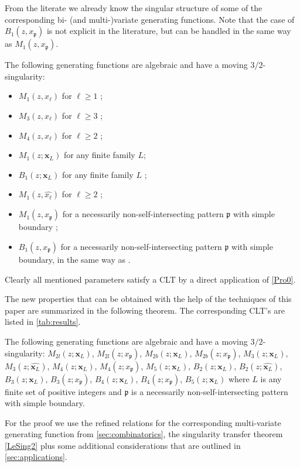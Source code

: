 \documentclass[a4paper,UKenglish,cleveref, autoref, thm-restate]{lipics-v2021}
\renewcommand{\(}{\left(}
\renewcommand{\)}{\right)}
\newcommand{\nnsi}{necessarily non-self-intersecting}
\newcommand{\p}{\mathfrak{p}}
\newcommand{\subfamily}{_L}
\newcommand{\xface}{x_{\ell}}
\newcommand{\x}{\mathbf{x}\subfamily}
\newcommand{\xellgon}{\widehat{\xface}}
\newcommand{\xallgons}{\widehat{\x}}
\newcommand{\xpatt}{x_{\p}}
\begin{document}
From the literate we already know the singular structure 
of some of the corresponding bi- (and multi-)variate generating functions.
Note that the case of $B_1(z,x_{\p})$ is not explicit in the literature,
but can be handled in the same way as $M_1(z,x_{\p})$.
\begin{proposition}
\label{prop:state-art-3-2-sg}
The following generating functions are algebraic and have a moving $3/2$-singularity:
\begin{itemize}
    \item $M_1(z, \xface)$ for $\ell \geq 1$ \cite[Lemma 4]{DP13};
    \item $M_3(z, \xface)$ for $\ell \geq 3$ \cite[\S5.4]{Yu19};
    \item $M_4(z, \xface)$ for $\ell \geq 2$ \cite[\S 6]{DP13};
    \item $M_1(z; \x)$ for any finite family $L$\cite[\S5]{CDK19};
    \item $B_1(z; \x)$ for any finite family $L$ \cite[\S4]{CDK19};
    \item $M_1(z, \xellgon)$ for $\ell \geq 2$ \cite[\S5.2]{Yu19};
    \item $M_1(z,x_{\p})$ for a \nnsi{} pattern $\p$ with simple boundary \cite[Proposition 2.1]{DHW25};
    \item $B_1(z,x_{\p})$ for a \nnsi{} pattern $\p$ with simple boundary, in the same way as \cite[Proposition 2.1]{DHW25}.
\end{itemize}
\end{proposition}
Clearly all mentioned parameters satisfy a CLT by a direct application of \cref{Pro0}.

The new properties that can be obtained with the help of the techniques of this paper
are summarized in the following theorem. The corresponding CLT's are 
listed in \cref{tab:results}.
\begin{theorem}
The following generating functions are algebraic and have a moving $3/2$-singularity:
$M_{2l}(z; \x)$, $M_{2l}(z; x_{\p})$, $M_{2b}(z; \x)$, $M_{2b}(z; x_{\p})$,
$M_{3}(z; \x)$, $M_{3}(z; \xallgons)$,
$M_4(z; \x)$, $M_4(z; \xpatt)$,
$M_5(z; \x)$,
$B_{2}(z; \x)$, $B_{2}(z; \xallgons)$,
$B_{3}(z; \x)$, $B_{3}(z; x_{\p})$,
$B_{4}(z; \x)$, $B_{4}(z; x_{\p})$,
$B_{5}(z; \x)$
where $L$ is any finite set of positive integers and $\p$ is a \nnsi{} pattern with simple boundary.
\end{theorem}
For the proof we use the refined relations for the corresponding multi-variate
generating function from \cref{sec:combinatorics}, the singularity
transfer theorem \cref{LeSing2} plus some additional considerations
that are outlined in \cref{sec:applications}.
\end{document}
